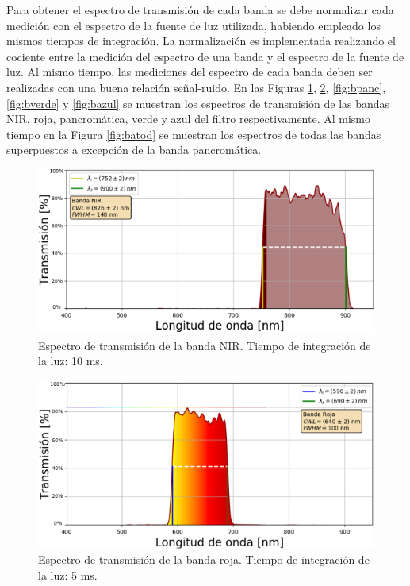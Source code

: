 Para obtener el espectro de transmisión de cada banda se debe normalizar cada medición con el espectro de la fuente de luz utilizada, habiendo empleado los mismos tiempos de integración. La normalización es implementada realizando el cociente entre la medición del espectro de una banda y el espectro de la fuente de luz. Al mismo tiempo, las mediciones del espectro de cada banda deben ser realizadas con una buena relación señal-ruido. En las Figuras \ref{fig:bnir}, \ref{fig:broja}, \ref{fig:bpanc}, \ref{fig:bverde} y \ref{fig:bazul} se muestran los espectros de transmisión de las bandas NIR, roja, pancromática, verde y azul del filtro respectivamente. Al mismo tiempo en la Figura \ref{fig:batod} se muestran los espectros de todas las bandas superpuestos a excepción de la banda pancromática.
\begin{figure}[H]
	\centering
	\includegraphics[width=1.0\textwidth]{Figs/microespectrometro/espectro_nirt.png}
	\caption{Espectro de transmisión de la banda NIR. Tiempo de integración de la luz: 10 ms.}
	\label{fig:bnir}
\end{figure}
\begin{figure}[H]
	\centering
	\includegraphics[width=1.0\textwidth]{Figs/microespectrometro/espectro_rojat.png}
	\caption{Espectro de transmisión de la banda roja. Tiempo de integración de la luz: 5 ms.}
	\label{fig:broja}
\end{figure}
